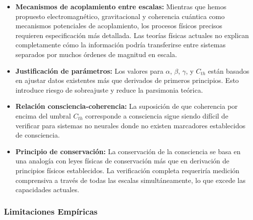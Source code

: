\documentclass[12pt]{article}
\begin{document}
\begin{itemize}
    \item \textbf{Mecanismos de acoplamiento entre escalas:} Mientras que hemos propuesto electromagnético, gravitacional y coherencia cuántica como mecanismos potenciales de acoplamiento, los procesos físicos precisos requieren especificación más detallada. Las teorías físicas actuales no explican completamente cómo la información podría transferirse entre sistemas separados por muchos órdenes de magnitud en escala.
    
    \item \textbf{Justificación de parámetros:} Los valores para $\alpha$, $\beta$, $\gamma$, y $C_{th}$ están basados en ajustar datos existentes más que derivados de primeros principios. Esto introduce riesgo de sobreajuste y reduce la parsimonia teórica.
    
    \item \textbf{Relación consciencia-coherencia:} La suposición de que coherencia por encima del umbral $C_{th}$ corresponde a consciencia sigue siendo difícil de verificar para sistemas no neurales donde no existen marcadores establecidos de consciencia.
    
    \item \textbf{Principio de conservación:} La conservación de la consciencia se basa en una analogía con leyes físicas de conservación más que en derivación de principios físicos establecidos. La verificación completa requeriría medición comprensiva a través de todas las escalas simultáneamente, lo que excede las capacidades actuales.
\end{itemize}

\subsubsection{Limitaciones Empíricas}
\end{document}
